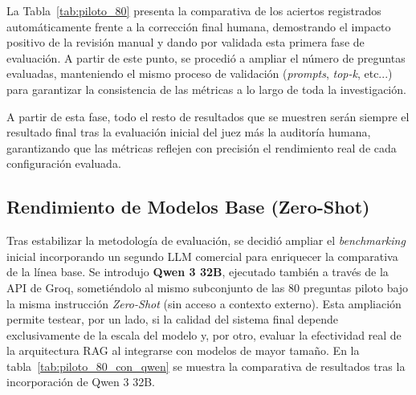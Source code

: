 La Tabla~\ref{tab:piloto_80} presenta la comparativa de los aciertos registrados automáticamente frente a la corrección final humana, demostrando el impacto positivo de la revisión manual y dando por validada esta primera fase de evaluación. A partir de este punto, se procedió a ampliar el número de preguntas evaluadas, manteniendo el mismo proceso de validación (\textit{prompts}, \textit{top-k}, etc...) para garantizar la consistencia de las métricas a lo largo de toda la investigación.
\clearpage
\begin{table}[ht]
\centering
{}
\caption{Resultados de la prueba piloto (80 preguntas). Comparativa entre la evaluación automática inicial y la auditoría final humana.}
\label{tab:piloto_80}
\end{table}

A partir de esta fase, todo el resto de resultados que se muestren serán siempre el resultado final tras la evaluación inicial del juez más la auditoría humana, garantizando que las métricas reflejen con precisión el rendimiento real de cada configuración evaluada.

\subsection{Rendimiento de Modelos Base (Zero-Shot)}

Tras estabilizar la metodología de evaluación, se decidió ampliar el \textit{benchmarking} inicial incorporando un segundo LLM comercial para enriquecer la comparativa de la línea base. Se introdujo \textbf{Qwen 3 32B}, ejecutado también a través de la API de Groq, sometiéndolo al mismo subconjunto de las 80 preguntas piloto bajo la misma instrucción \textit{Zero-Shot} (sin acceso a contexto externo). Esta ampliación permite testear, por un lado, si la calidad del sistema final depende exclusivamente de la escala del modelo y, por otro, evaluar la efectividad real de la arquitectura RAG al integrarse con modelos de mayor tamaño. En la tabla~\ref{tab:piloto_80_con_qwen} se muestra la comparativa de resultados tras la incorporación de Qwen 3 32B.

